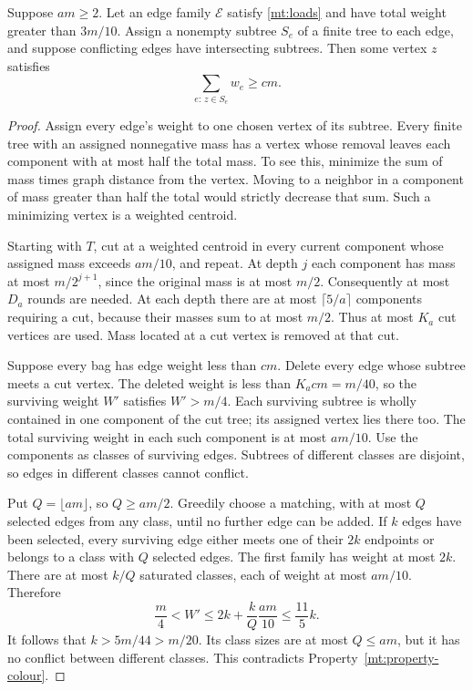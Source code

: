 \begin{lemma}\label{mt:weighted-bag}
Suppose \(am\ge2\).  Let an edge family \(\mathcal E\) satisfy
\eqref{mt:loads} and have total weight greater than \(3m/10\).
Assign a nonempty subtree \(S_e\) of a finite tree to each edge,
and suppose conflicting edges have intersecting subtrees.
Then some vertex \(z\) satisfies
\[
 \sum_{e:\,z\in S_e}w_e\ge cm.
\]
\end{lemma}
\begin{proof}
Assign every edge's weight to one chosen vertex of its subtree.
Every finite tree with an assigned nonnegative mass has a vertex
whose removal leaves each component with at most half the total
mass.  To see this, minimize the sum of mass times graph distance
from the vertex.  Moving to a neighbor in a component of mass
greater than half the total would strictly decrease that sum.
Such a minimizing vertex is a weighted centroid.

Starting with \(T\), cut at a weighted centroid in every current
component whose assigned mass exceeds \(am/10\), and repeat.
At depth \(j\) each component has mass at most \(m/2^{j+1}\),
since the original mass is at most \(m/2\).  Consequently at most
\(D_a\) rounds are needed.  At each depth there are at most
\(\lceil5/a\rceil\) components requiring a cut, because their
masses sum to at most \(m/2\).  Thus at most \(K_a\) cut vertices
are used.  Mass located at a cut vertex is removed at that cut.

Suppose every bag has edge weight less than \(cm\).  Delete every
edge whose subtree meets a cut vertex.  The deleted weight is less
than \(K_acm=m/40\), so the surviving weight \(W'\) satisfies
\(W'>m/4\).  Each surviving subtree is wholly contained in one
component of the cut tree; its assigned vertex lies there too.
The total surviving weight in each such component is at most
\(am/10\).  Use the components as classes of surviving edges.
Subtrees of different classes are disjoint, so edges in different
classes cannot conflict.

Put \(Q=\lfloor am\rfloor\), so \(Q\ge am/2\).  Greedily choose
a matching, with at most \(Q\) selected edges from any class,
until no further edge can be added.  If \(k\) edges have been
selected, every surviving edge either meets one of their \(2k\)
endpoints or belongs to a class with \(Q\) selected edges.  The
first family has weight at most \(2k\).  There are at most
\(k/Q\) saturated classes, each of weight at most \(am/10\).
Therefore
\[
 \frac m4<W'\le 2k+\frac{k}{Q}\frac{am}{10}
 \le\frac{11}{5}k.
\]
It follows that \(k>5m/44>m/20\).  Its class sizes are at most
\(Q\le am\), but it has no conflict between different classes.
This contradicts Property~\ref{mt:property-colour}.
\end{proof}

